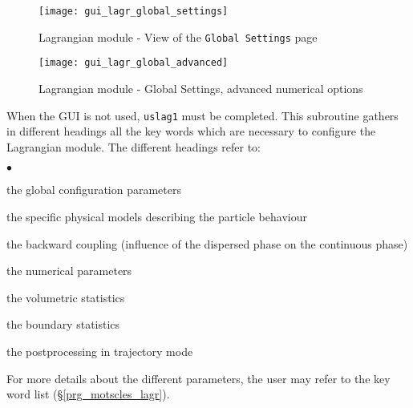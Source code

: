 {{\begin{figure}[ht]
\begin{center}
\texttt{[image: gui\_lagr\_global\_settings]}
\caption{Lagrangian module - View of the \texttt{Global Settings} page}
\label{fig:Ini-Lag1}
\end{center}
\end{figure}
% 
% 
 \begin{figure}[ht]
 \begin{center}
 \texttt{[image: gui\_lagr\_global\_advanced]}
 \caption{Lagrangian module - Global Settings, advanced numerical options}
 \label{fig:Ini-Lag3}
 \end{center}
 \end{figure}
% 
% 


\noindent
When the GUI is not used, \texttt{uslag1} must be completed. This subroutine gathers in different headings all the key words which are
necessary to configure the Lagrangian module. The different headings refer to:
\begin{list}{$\bullet$}{}
\item the global configuration parameters
\item the specific physical models describing the particle behaviour
\item the backward coupling (influence of the dispersed phase on the
      continuous phase)
\item the numerical parameters
\item the volumetric statistics
\item the boundary statistics
\item the postprocessing in trajectory mode
\end{list}
%
\noindent
For more details about the different parameters, the user may refer to the
key word list (\S\ref{prg_motscles_lagr}).




}}
